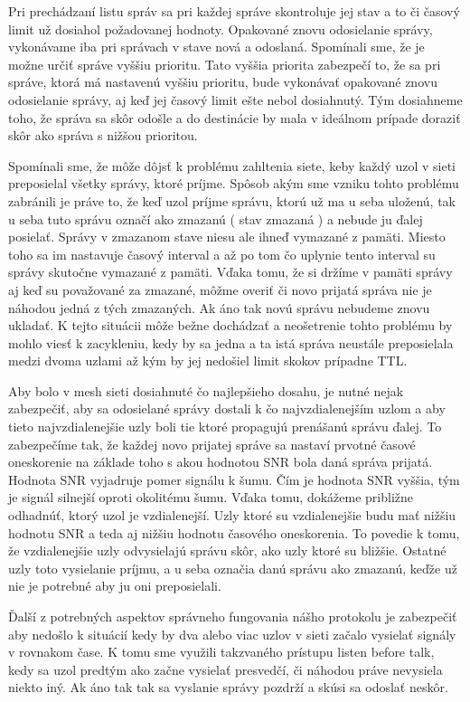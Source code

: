 \documentclass[slovak,master]{diploma}
\begin{document}
Pri prechádzaní listu správ sa pri každej správe skontroluje jej stav a to či časový limit už dosiahol požadovanej hodnoty. Opakované znovu odosielanie 
správy, vykonávame iba pri správach v stave nová a odoslaná. Spomínali sme, že je možne určiť správe vyššiu prioritu. Tato vyššia priorita zabezpečí to, že sa pri správe, 
ktorá má nastavenú vyššiu prioritu, bude vykonávať opakované znovu odosielanie správy, aj keď jej časový limit ešte nebol dosiahnutý. Tým dosiahneme toho, že správa sa 
skôr odošle a do destinácie by mala v ideálnom prípade doraziť skôr ako správa s nižšou prioritou.

Spomínali sme, že môže dôjsť k problému zahltenia siete, keby každý uzol v sieti preposielal všetky správy, ktoré príjme. Spôsob akým sme vzniku tohto problému zabránili 
je práve to, že keď uzol príjme správu, ktorú už ma u seba uloženú, tak u seba tuto správu označí ako zmazanú ( stav zmazaná ) a nebude ju ďalej posielať. 
Správy v zmazanom stave niesu ale ihneď vymazané z pamäti. Miesto toho sa im nastavuje časový interval a až po tom čo uplynie tento interval su správy skutočne vymazané z pamäti. 
Vďaka tomu, že si držíme v pamäti správy aj keď su považované za zmazané, môžme overiť či novo prijatá správa nie je náhodou jedná z tých zmazaných. Ak áno tak novú 
správu nebudeme znovu ukladať. K tejto situácii môže bežne dochádzať a neošetrenie tohto problému by mohlo viesť k zacykleniu, kedy by sa jedna a ta istá správa neustále 
preposielala medzi dvoma uzlami až kým by jej nedošiel limit skokov prípadne TTL.

Aby bolo v mesh sieti dosiahnuté čo najlepšieho dosahu, je nutné nejak zabezpečiť, aby sa odosielané správy dostali k čo najvzdialenejším uzlom a aby tieto 
najvzdialenejšie uzly boli tie ktoré propagujú prenášanú správu ďalej. To zabezpečíme tak, že každej novo prijatej správe sa nastaví prvotné časové oneskorenie na základe 
toho s akou hodnotou SNR bola daná správa prijatá. Hodnota SNR vyjadruje pomer signálu k šumu. Čím je hodnota SNR vyššia, tým je signál silnejší oproti okolitému šumu.
Vďaka tomu, dokážeme približne odhadnúť, ktorý uzol je vzdialenejší. Uzly ktoré su vzdialenejšie budu mať nižšiu hodnotu SNR a teda aj nižšiu hodnotu časového oneskorenia.
To povedie k tomu, že vzdialenejšie uzly odvysielajú správu skôr, ako uzly ktoré su bližšie. Ostatné uzly toto vysielanie príjmu, a u seba označia danú správu ako zmazanú, 
keďže už nie je potrebné aby ju oni preposielali.

Ďalší z potrebných aspektov správneho fungovania nášho protokolu je zabezpečiť aby nedošlo k situácií kedy by dva alebo viac uzlov v sieti začalo vysielať signály v rovnakom čase.
K tomu sme využili takzvaného prístupu listen before talk, kedy sa uzol predtým ako začne vysielať presvedčí, či náhodou práve nevysiela niekto iný. Ak áno tak tak sa vyslanie správy pozdrží 
a skúsi sa odoslať neskôr.
\end{document}
